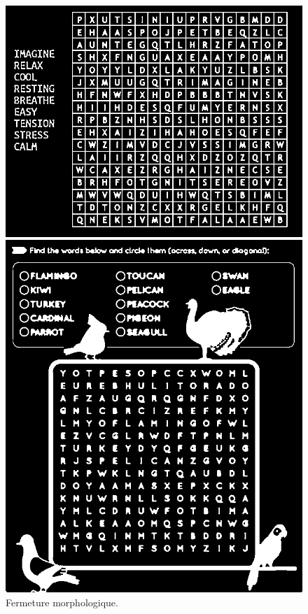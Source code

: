 \documentclass{article}
\begin{document}
\begin{figure}[H]
  \centering
      \includegraphics[width=\linewidth]{ressources/1level_1_image_1_07_morphology_closed.png}
      \caption{}
    \endminipage\quad\quad\quad\quad
    \includegraphics[width=\linewidth]{ressources/3level_3_image_2_07_morphology_closed.png}
    \caption{}
  \endminipage
  \caption{Fermeture morphologique.}
\end{figure}
\end{document}
